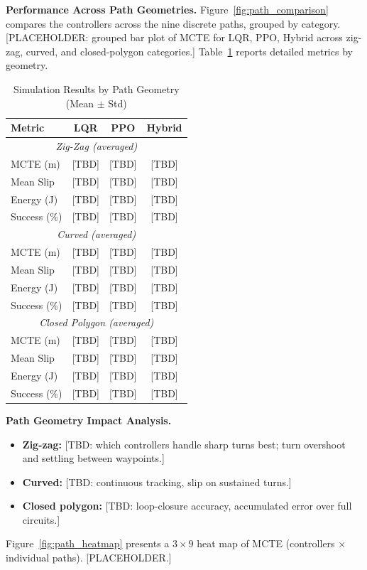 \documentclass[conference]{IEEEtran}
\begin{document}
\noindent\textbf{Performance Across Path Geometries.}
Figure~\ref{fig:path_comparison} compares the controllers across the nine discrete paths, grouped by category. [PLACEHOLDER: grouped bar plot of MCTE for LQR, PPO, Hybrid across zig-zag, curved, and closed-polygon categories.] Table~\ref{tab:path_results} reports detailed metrics by geometry.

\begin{table}[t]
\centering
\caption{Simulation Results by Path Geometry (Mean $\pm$ Std)}
\label{tab:path_results}
\begin{tabular}{@{}lccc@{}}
\toprule
\textbf{Metric} & \textbf{LQR} & \textbf{PPO} & \textbf{Hybrid} \\
\midrule
\multicolumn{4}{c}{\textit{Zig-Zag (averaged)}} \\
MCTE (m) & [TBD] & [TBD] & [TBD] \\
Mean Slip & [TBD] & [TBD] & [TBD] \\
Energy (J) & [TBD] & [TBD] & [TBD] \\
Success (\%) & [TBD] & [TBD] & [TBD] \\
\midrule
\multicolumn{4}{c}{\textit{Curved (averaged)}} \\
MCTE (m) & [TBD] & [TBD] & [TBD] \\
Mean Slip & [TBD] & [TBD] & [TBD] \\
Energy (J) & [TBD] & [TBD] & [TBD] \\
Success (\%) & [TBD] & [TBD] & [TBD] \\
\midrule
\multicolumn{4}{c}{\textit{Closed Polygon (averaged)}} \\
MCTE (m) & [TBD] & [TBD] & [TBD] \\
Mean Slip & [TBD] & [TBD] & [TBD] \\
Energy (J) & [TBD] & [TBD] & [TBD] \\
Success (\%) & [TBD] & [TBD] & [TBD] \\
\bottomrule
\end{tabular}
\end{table}

\noindent\textbf{Path Geometry Impact Analysis.}
\begin{itemize}
\item \textbf{Zig-zag:} [TBD: which controllers handle sharp turns best; turn overshoot and settling between waypoints.]
\item \textbf{Curved:} [TBD: continuous tracking, slip on sustained turns.]
\item \textbf{Closed polygon:} [TBD: loop-closure accuracy, accumulated error over full circuits.]
\end{itemize}
Figure~\ref{fig:path_heatmap} presents a $3\times9$ heat map of MCTE (controllers $\times$ individual paths). [PLACEHOLDER.]
\end{document}
